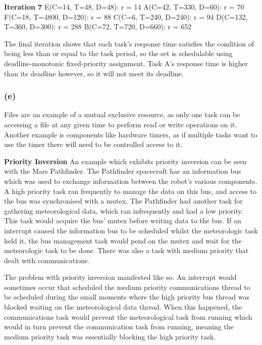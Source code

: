 \documentclass[]{report}
\begin{document}
			\textbf{Iteration 7} \newline
			E(C=14, T=48, D=48): r = 14 \newline
			A(C=42, T=330, D=60): r = 70 \newline
			F(C=18, T=4800, D=120): r = 88 \newline
			C(C=6, T=240, D=240): r = 94 \newline
			D(C=132, T=360, D=300): r = 288 \newline
			B(C=72, T=720, D=660): r = 652 \newline
		
			The final iteration shows that each task's response time satisfies the condition of being less than or equal to the task period, so the set is schedulable using deadline-monotonic fixed-priority assignment. Task A's response time is higher than its deadline however, so it will not meet its deadline.
			
			\subsubsection{(e)}
			Files are an example of a mutual exclusive resource, as only one task can be accessing a file at any given time to perform read or write operations on it. Another example is components like hardware timers, as if multiple tasks want to use the timer there will need to be controlled access to it. 
			\medskip

			\textbf{Priority Inversion}\newline
			An example which exhibits priority inversion can be seen with the Mars Pathfinder. The Pathfinder spacecraft has an information bus which was used to exchange information between the robot's various components. A high priority task ran frequently to manage the data on this bus, and access to the bus was synchronised with a mutex. The Pathfinder had another task for gathering meteorological data, which ran infrequently and had a low priority.  This task would acquire the bus' mutex before writing data to the bus. If an interrupt caused the information bus to be scheduled whilst the meteorologic task held it, the bus management task would pend on the mutex and wait for the meteorologic task to be done.  There was also a task with medium priority that dealt with communications. 
			
			The problem with priority inversion manifested like so. An interrupt would sometimes occur that scheduled the medium priority communications thread to be scheduled during the small moments where the high priority bus thread was blocked waiting on the meteorological data thread. When this happened, the communications task would prevent the meteorological task from running which would in turn prevent the communication task from running, meaning the medium priority task was essentially blocking the high priority task\cite{jones1997really}.
			\medskip
			
\end{document}
